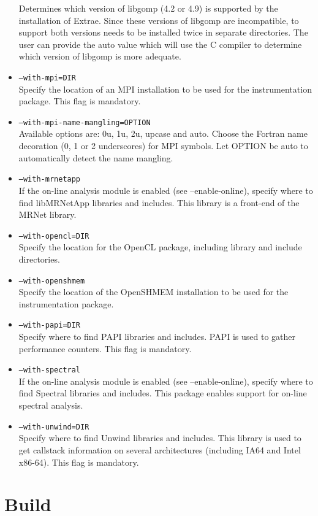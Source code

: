\begin{itemize}
	Determines which version of libgomp (4.2 or 4.9) is supported by the installation of Extrae. Since these versions of libgomp are incompatible, to support both versions \TRACE needs to be installed twice in separate directories. The user can provide the auto value which will use the C compiler to determine which version of libgomp is more adequate.
	\item {\tt --with-mpi=DIR} \\
	Specify the location of an MPI installation to be used for the instrumentation package. This flag is mandatory.
	\item {\tt --with-mpi-name-mangling=OPTION} \\
	Available options are: 0u, 1u, 2u, upcase and auto. Choose the Fortran name decoration (0, 1 or 2 underscores) for MPI symbols. Let OPTION be auto to automatically detect the name mangling.
        \item {\tt --with-mrnetapp} \\
        If the on-line analysis module is enabled (see --enable-online), specify where to find libMRNetApp libraries and includes. This library is a front-end of the MRNet library. 
	\item {\tt --with-opencl=DIR} \\
	Specify the location for the OpenCL package, including library and include directories.
        \item {\tt --with-openshmem} \\
        Specify the location of the OpenSHMEM installation to be used for the instrumentation package. 
	\item {\tt --with-papi=DIR} \\
	Specify where to find PAPI libraries and includes. PAPI is used to gather performance counters. This flag is mandatory.
        \item {\tt --with-spectral} \\
        If the on-line analysis module is enabled (see --enable-online), specify where to find Spectral libraries and includes. This package enables support for on-line spectral analysis.
	\item {\tt --with-unwind=DIR} \\
	Specify where to find Unwind libraries and includes. This library is used to get callstack information on several architectures (including IA64 and Intel x86-64). This flag is mandatory.
\end{itemize}

\section{Build}

